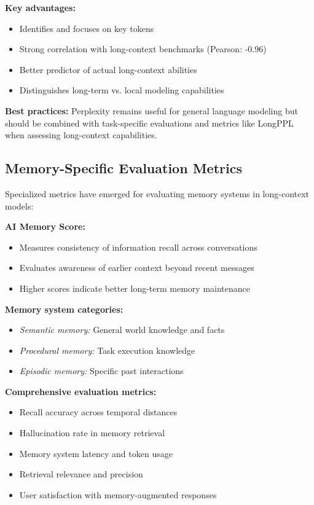 \documentclass[11pt]{article}
\begin{document}
\textbf{Key advantages:}
\begin{itemize}[leftmargin=*]
    \item Identifies and focuses on key tokens
    \item Strong correlation with long-context benchmarks (Pearson: -0.96)
    \item Better predictor of actual long-context abilities
    \item Distinguishes long-term vs. local modeling capabilities
\end{itemize}

\textbf{Best practices:} Perplexity remains useful for general language modeling but should be combined with task-specific evaluations and metrics like LongPPL when assessing long-context capabilities.

\subsection{Memory-Specific Evaluation Metrics}

Specialized metrics have emerged for evaluating memory systems in long-context models:

\textbf{AI Memory Score:}
\begin{itemize}[leftmargin=*]
    \item Measures consistency of information recall across conversations
    \item Evaluates awareness of earlier context beyond recent messages
    \item Higher scores indicate better long-term memory maintenance
\end{itemize}

\textbf{Memory system categories:}
\begin{itemize}[leftmargin=*]
    \item \textit{Semantic memory:} General world knowledge and facts
    \item \textit{Procedural memory:} Task execution knowledge
    \item \textit{Episodic memory:} Specific past interactions
\end{itemize}

\textbf{Comprehensive evaluation metrics:}
\begin{itemize}[leftmargin=*]
    \item Recall accuracy across temporal distances
    \item Hallucination rate in memory retrieval
    \item Memory system latency and token usage
    \item Retrieval relevance and precision
    \item User satisfaction with memory-augmented responses
\end{itemize}
\end{document}
